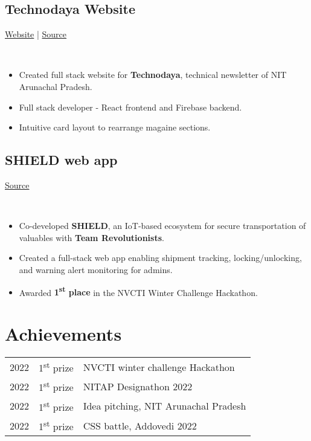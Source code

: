 \documentclass[]{article}
\newcommand{\subheading}[2]{
  {\subsection{#1}
  \hfill{#2}}\\
  \vspace{2pt}
}
\newenvironment{tightemize}{
\vspace{-8pt}\begin{itemize}\itemsep1pt \parskip0pt \parsep0pt}
{\end{itemize}\vspace{-\topsep}}
\begin{document}
\begin{multicols}{2}
\begin{flushleft}
    \subheading{Technodaya Website}{
      \href{https://technodaya.netlify.app}{Website} | 
      \href{https://github.com/PursottamSah6003}{Source}
    }
    \begin{tightemize}
      \item Created full stack website for \textbf{Technodaya}, technical newsletter of NIT Arunachal Pradesh.
      \item Full stack developer - React frontend and Firebase backend.
      \item Intuitive card layout to rearrange magaine sections. 
    \end{tightemize}

    \subheading{SHIELD web app}{\href{https://github.com/tripathics}{Source}}
    \begin{tightemize}
      \item Co-developed \textbf{SHIELD}, an IoT-based ecosystem for secure transportation of valuables with \textbf{Team Revolutionists}.
      \item Created a full-stack web app enabling shipment tracking, locking/unlocking, and warning alert monitoring for admins.
      \item Awarded \textbf{1\textsuperscript{st} place} in the NVCTI Winter Challenge Hackathon.
    \end{tightemize}

    \section{Achievements}
    \begin{tabular}{rll}
      2022 & 1\textsuperscript{st} prize & NVCTI winter challenge Hackathon\\
      2022 & 1\textsuperscript{st} prize & NITAP Designathon 2022\\
      2022 & 1\textsuperscript{st} prize & Idea pitching, NIT Arunachal Pradesh\\
      2022 & 1\textsuperscript{st} prize & CSS battle, Addovedi 2022\\
    \end{tabular}
  \end{flushleft}
\end{multicols}
\end{document}
